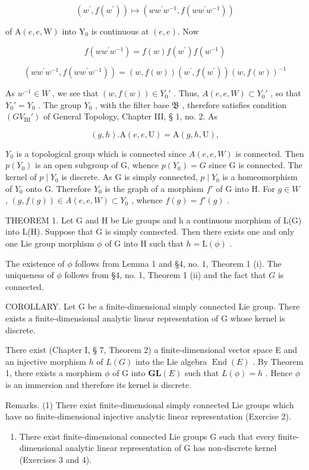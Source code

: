 \[
\left(w ^ {\prime}, f \left(w ^ {\prime}\right)\right) \mapsto \left(w w ^ {\prime} w ^ {- 1}, f \left(w w ^ {\prime} w ^ {- 1}\right)\right)
\]

of \(\mathrm{A}(e,e,\mathrm{W})\) into \(\mathrm{Y}_0\) is continuous at \((e,e)\). Now

\[
f \left(w w ^ {\prime} w ^ {- 1}\right) = f (w) f \left(w ^ {\prime}\right) f \left(w ^ {- 1}\right)
\]

\[
\left(w w ^ {\prime} w ^ {- 1}, f \left(w w ^ {\prime} w ^ {- 1}\right)\right) = (w, f (w)) \left(w ^ {\prime}, f \left(w ^ {\prime}\right)\right) \left(w, f (w)\right) ^ {- 1}
\]

As \(w^{-1} \in W\) , we see that \((w, f(w)) \in Y_0'\) . Thus, \(A(e, e, W) \subset Y_0'\) , so that \(Y_0' = Y_0\) . The group \(Y_0\) , with the filter base \(\mathfrak{B}\) , therefore satisfies condition \((GV_{\mathrm{III}}')\) of General Topology, Chapter III, § 1, no. 2. As

\[
(g, h). \mathrm{A} (e, e, \mathrm{U}) = \mathrm{A} (g, h, \mathrm{U}),
\]

\(Y_{0}\) is a topological group which is connected since \(A(e, e, W)\) is connected. Then \(p(Y_{0})\) is an open subgroup of G, whence \(p(Y_{0}) = G\) since G is connected. The kernel of \(p \mid Y_{0}\) is discrete. As G is simply connected, \(p \mid Y_{0}\) is a homeomorphism of \(Y_{0}\) onto G. Therefore \(Y_{0}\) is the graph of a morphism \(f'\) of G into H. For \(g \in W\) , \((g, f(g)) \in A(e, e, W) \subset Y_{0}\) , whence \(f(g) = f'(g)\) .

THEOREM 1. Let G and H be Lie groups and h a continuous morphism of L(G) into L(H). Suppose that G is simply connected. Then there exists one and only one Lie group morphism \(\phi\) of G into H such that \(h = \mathrm{L}(\phi)\) .

The existence of \(\phi\) follows from Lemma 1 and §4, no. 1, Theorem 1 (i). The uniqueness of \(\phi\) follows from §4, no. 1, Theorem 1 (ii) and the fact that \(G\) is connected.

COROLLARY. Let G be a finite-dimensional simply connected Lie group. There exists a finite-dimensional analytic linear representation of G whose kernel is discrete.

There exist (Chapter I, § 7, Theorem 2) a finite-dimensional vector space E and an injective morphism \(h\) of \(L(G)\) into the Lie algebra \(\operatorname{End}(E)\) . By Theorem 1, there exists a morphism \(\phi\) of G into \(\mathbf{GL}(E)\) such that \(L(\phi) = h\) . Hence \(\phi\) is an immersion and therefore its kernel is discrete.

Remarks. (1) There exist finite-dimensional simply connected Lie groups which have no finite-dimensional injective analytic linear representation (Exercise 2).

\begin{enumerate}
\def\labelenumi{(\arabic{enumi})}
\setcounter{enumi}{1}
\tightlist
\item
  There exist finite-dimensional connected Lie groups G such that every finite-dimensional analytic linear representation of G has non-discrete kernel (Exercises 3 and 4).
\end{enumerate}

